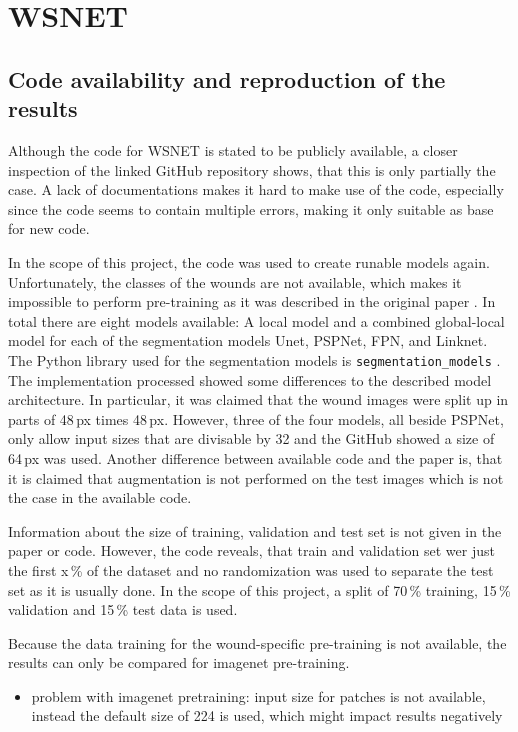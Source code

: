 \section{WSNET}

\subsection{Code availability and reproduction of the results}

Although the code for WSNET \cite{Oota_2023_WACV} is stated to be publicly available, a closer inspection of the linked GitHub repository shows, that this is only partially the case. A lack of documentations makes it hard to make use of the code, especially since the code seems to contain multiple errors, making it only suitable as base for new code.

In the scope of this project, the code was used to create runable models again. Unfortunately, the classes of the wounds are not available, which makes it impossible to perform pre-training as it was described in the original paper \cite{Oota_2023_WACV}. In total there are eight models available: A local model and a combined global-local model for each of the segmentation models Unet, PSPNet, FPN, and Linknet. The Python library used for the segmentation models is \texttt{segmentation\_models} \cite{SegmentationModels}. The implementation processed showed some differences to the described model architecture. In particular, it was claimed that the wound images were split up in parts of 48\,px times 48\,px. However, three of the four models, all beside PSPNet, only allow input sizes that are divisable by 32 and the GitHub showed a size of 64\,px was used. Another difference between available code and the paper is, that it is claimed that augmentation is not performed on the test images which is not the case in the available code.

Information about the size of training, validation and test set is not given in the paper or code. However, the code reveals, that train and validation set wer just the first x\,\% of the dataset and no randomization was used to separate the test set as it is usually done. In the scope of this project, a split of 70\,\% training, 15\,\% validation and 15\,\% test data is used.

Because the data training for the wound-specific pre-training is not available, the results can only be compared for imagenet pre-training.


\begin{itemize}
	\item problem with imagenet pretraining: input size for patches is not available, instead the default size of 224 is used, which might impact results negatively
\end{itemize}


